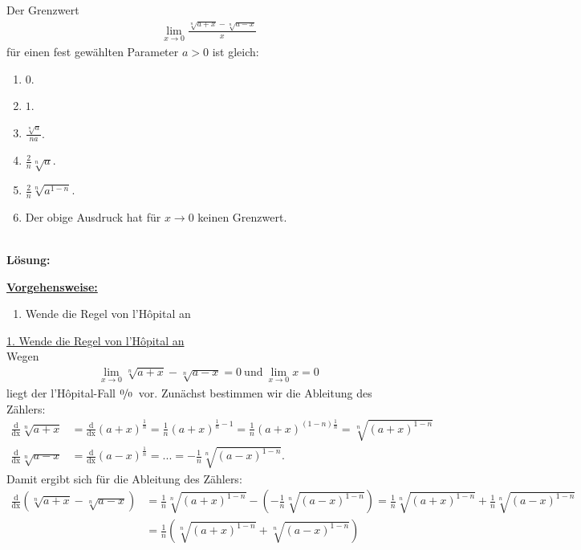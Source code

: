\subsection*{}
Der Grenzwert
\begin{align*}
	\lim\limits_{x \to 0 }
	\frac{\sqrt[n]{a+x} - \sqrt[n]{a-x}}{x}
\end{align*}
für einen fest gewählten Parameter $ a > 0  $ ist gleich:
\renewcommand{\labelenumi}{(\alph{enumi})}
\begin{enumerate}
	\item 
	$0$.
	\item
	$1$.
	\item
	$\frac{\sqrt[n]{a}}{na}$.
	\item
	$\frac{2}{n} \sqrt[n]{a}$.
	\item
	$\frac{2}{n} \sqrt[n]{a^{1-n}}$.
	\item
	Der obige Ausdruck hat für $ x \to 0 $ keinen Grenzwert.	
\end{enumerate}
\ \\
\textbf{Lösung:}
\begin{mdframed}
\underline{\textbf{Vorgehensweise:}}
\renewcommand{\labelenumi}{\theenumi.}
\begin{enumerate}
\item Wende die Regel von l'H\^{o}pital an
\end{enumerate}
\end{mdframed}

\underline{1. Wende die Regel von l'H\^{o}pital an}\\
Wegen
\begin{align*}
	\lim \limits_{x \to 0} \sqrt[n]{a+x} - \sqrt[n]{a-x} = 0
	\ \textrm{und} \
	\lim \limits_{x \to 0} x = 0
\end{align*}
liegt der l'H\^{o}pital-Fall \glqq$ \nicefrac{0}{0} $\grqq~vor.
Zunächst bestimmen wir die Ableitung des Zählers:
\begin{align*}
	\frac{\mathrm{d}}{ \mathrm{dx} }\sqrt[n]{a+x}
	&=
	\frac{\mathrm{d}}{\mathrm{dx} }(a+x)^{\frac{1}{n}}
	=
	\frac{1}{n}(a+x)^{\frac{1}{n} -1}
	= 
	\frac{1}{n}(a+x)^{\left(1 - n\right) \frac{1}{n} }
	=
	\sqrt[n]{(a+x)^{1 - n }}\\
	\frac{\mathrm{d}}{\mathrm{dx} }\sqrt[n]{a-x}
	&=
	\frac{\mathrm{d}}{\mathrm{dx} }(a-x)^{\frac{1}{n}}
	=
	...
	=
	-\frac{1}{n}\sqrt[n]{(a-x)^{1 - n }}.
\end{align*}
Damit ergibt sich für die Ableitung des Zählers:
\begin{align*}
		\frac{\mathrm{d}}{ \mathrm{dx} } \left(\sqrt[n]{a+x} - \sqrt[n]{a-x} \right)
		&=
		\frac{1}{n}\sqrt[n]{(a+x)^{1 - n }} -\left(-\frac{1}{n}\sqrt[n]{(a-x)^{1 - n }}\right)
		=
		\frac{1}{n}\sqrt[n]{(a+x)^{1 - n }} +\frac{1}{n}\sqrt[n]{(a-x)^{1 - n }}\\
		&=
		\frac{1}{n}
		\left(\sqrt[n]{(a+x)^{1 - n }}+\sqrt[n]{(a-x)^{1 - n }}\right)
\end{align*}



